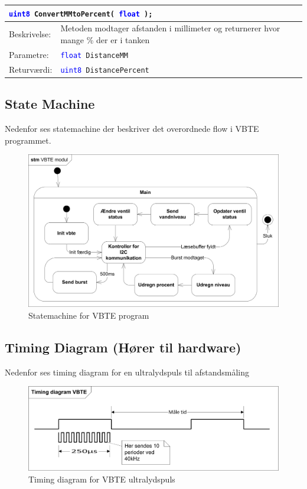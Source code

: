 \begin{table}[H]
\begin{tabular}{l p{12.5cm}}
\multicolumn{2}{l}{\texttt{\textcolor{blue}{uint8} ConvertMMtoPercent( \textcolor{blue}{float} );}} \\
\hline
Beskrivelse:&Metoden modtager afstanden i millimeter og returnerer hvor mange \% der er i tanken\\
Parametre:&\texttt{\textcolor{blue}{float} DistanceMM}\\
Returværdi:&\texttt{\textcolor{blue}{uint8} DistancePercent}\\
\end{tabular}
\end{table}
\subsection{State Machine}
Nedenfor ses statemachine der beskriver det overordnede flow i VBTE programmet.
\begin{figure}[H]
\centering
\includegraphics[width=1\textwidth]{billeder/STMVBTE}
\caption{Statemachine for VBTE program}
\end{figure}

\subsection{Timing Diagram (Hører til hardware)}
Nedenfor ses timing diagram for en ultralydspuls til afstandsmåling
\begin{figure}[H]
\centering
\includegraphics[width=1\textwidth]{billeder/TimingdiagramVBTE}
\caption{Timing diagram for VBTE ultralydspuls}
\end{figure}